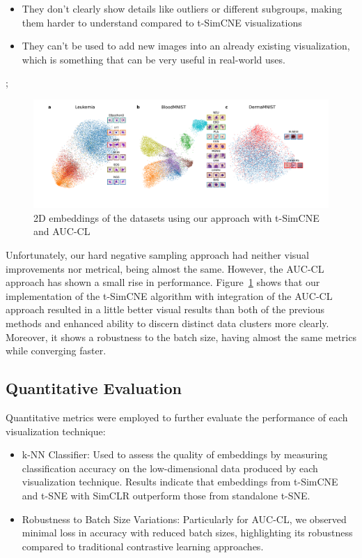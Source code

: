 \begin{itemize}
    \item They don't clearly show details like outliers or different subgroups, making them harder to understand compared to t-SimCNE visualizations
    \item They can't be used to add new images into an already existing visualization, which is something that can be very useful in real-world uses.
\end{itemize};

\begin{figure}[hbt]
\centering
\includegraphics[width=\textwidth]{figs/toy_datasets_long_2.png}
\caption{
2D embeddings of the datasets using our approach with t-SimCNE and AUC-CL
}
\label{fig:tsimcne_auc_cl}
\end{figure}

Unfortunately, our hard negative sampling approach had neither visual improvements nor metrical, being almost the same. However, the AUC-CL approach has shown a small rise in performance. Figure~\ref{fig:tsimcne_auc_cl} shows that our implementation of the t-SimCNE algorithm with integration of the AUC-CL approach resulted in a little better visual results than both of the previous methods and enhanced ability to discern distinct data clusters more clearly. Moreover, it shows a robustness to the batch size, having almost the same metrics while converging faster.

\subsection{Quantitative Evaluation}

Quantitative metrics were employed to further evaluate the performance of each visualization technique:

\begin{itemize}
    \item {k-NN Classifier}: Used to assess the quality of embeddings by measuring classification accuracy on the low-dimensional data produced by each visualization technique. Results indicate that embeddings from t-SimCNE and t-SNE with SimCLR outperform those from standalone t-SNE.
    \item {Robustness to Batch Size Variations}: Particularly for AUC-CL, we observed minimal loss in accuracy with reduced batch sizes, highlighting its robustness compared to traditional contrastive learning approaches.
\end{itemize}

